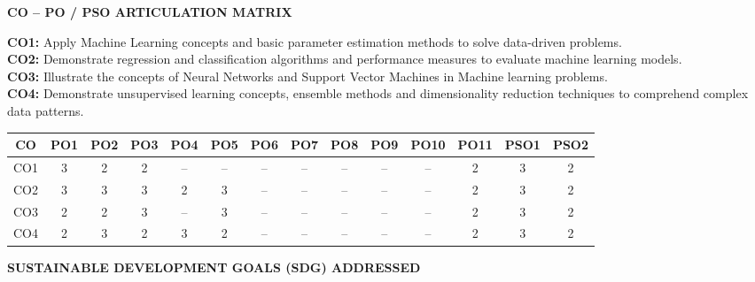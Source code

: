 \documentclass[12pt,oneside]{report}
\begin{document}
\thispagestyle{plain}
\begin{center}
\vspace{0.05in}
{\large\bfseries CO -- PO / PSO  ARTICULATION MATRIX}
\end{center}
\textbf{CO1:} Apply Machine Learning concepts and basic parameter estimation methods to solve data-driven problems.\\
\textbf{CO2:} Demonstrate regression and classification algorithms and performance measures to evaluate machine learning models.\\
\textbf{CO3:} Illustrate the concepts of Neural Networks and Support Vector Machines in Machine learning problems.\\
\textbf{CO4:} Demonstrate unsupervised learning concepts, ensemble methods and dimensionality reduction techniques to comprehend complex data patterns.
\begin{center}
\begin{tabular}{|c|*{11}{c|}c|c|}
\hline
\textbf{CO}
& \textbf{PO1} & \textbf{PO2} & \textbf{PO3}
& \textbf{PO4} & \textbf{PO5} & \textbf{PO6}
& \textbf{PO7} & \textbf{PO8} & \textbf{PO9}
& \textbf{PO10} & \textbf{PO11}
& \textbf{PSO1} & \textbf{PSO2} \\ \hline

CO1 & 3 & 2 & 2 & -- & -- & -- & -- & -- & -- & -- & 2 & 3 & 2 \\ \hline
CO2 & 3 & 3 & 3 & 2 & 3 & -- & -- & -- & -- & -- & 2 & 3 & 2 \\ \hline
CO3 & 2 & 2 & 3 & -- & 3 & -- & -- & -- & -- & -- & 2 & 3 & 2 \\ \hline
CO4 & 2 & 3 & 2 & 3 & 2 & -- & -- & -- & -- & -- & 2 & 3 & 2 \\ \hline
\end{tabular}
\end{center}

\vspace{0.10in}
\begin{center}
    {\large\bfseries SUSTAINABLE DEVELOPMENT GOALS (SDG) ADDRESSED}
\end{center}

\vspace{0.05cm}
\end{document}
